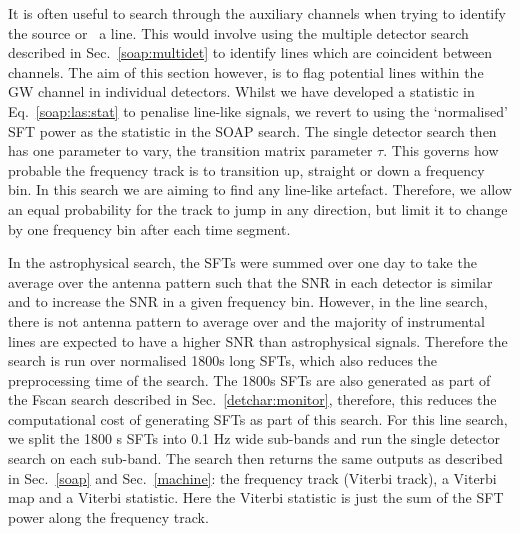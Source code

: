 It is often useful to search through the auxiliary channels when trying to
identify the source or~ a line. 
This would involve using the multiple detector search described in Sec.~\ref{soap:multidet} to identify lines which are coincident between channels. 
The aim of this section however, is to flag potential lines within the \gls{GW} channel in individual detectors.
Whilst we have developed a statistic in Eq.~\ref{soap:las:stat} to penalise
line-like signals, we revert to using the
`normalised' \gls{SFT} power as the statistic in the SOAP search. The single
detector search then has one parameter to vary, the transition matrix
parameter $\tau$.  This governs how probable the frequency track is to transition up,
straight or down a frequency bin.  In this search we are aiming to find any line-like artefact.
Therefore, we allow an equal probability for the track to jump in any
direction, but limit it to change by one frequency bin after each time
segment.  

In the astrophysical search, the \glspl{SFT} were summed over one day to take the average over the antenna pattern such that the \gls{SNR} in each detector is similar and to increase the \gls{SNR} in a given frequency bin.
However, in the line search, there is not antenna pattern to average over and the majority of instrumental lines are expected to have a higher \gls{SNR} than astrophysical signals.
Therefore the search is run over normalised 1800s long \glspl{SFT}, which also reduces the preprocessing time of the search.
The 1800s \glspl{SFT} are also generated as part of the Fscan search described in Sec.~\ref{detchar:monitor}, therefore, this reduces the computational cost of generating \glspl{SFT} as part of this search. 
For this line search, we split the 1800 s \glspl{SFT} into 0.1 Hz wide sub-bands and run the single detector search on each sub-band. 
The search then returns the same outputs as described in
Sec.~\ref{soap} and Sec.~\ref{machine}: the frequency track (Viterbi track), a
Viterbi map and a Viterbi statistic.  Here the Viterbi statistic is just the
sum of the \gls{SFT} power along the frequency track.~  

